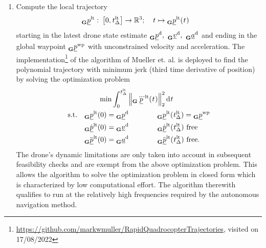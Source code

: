 \begin{enumerate}
    \item Compute the local trajectory 
    \begin{align} \label{eq:loc_traj}
        \pos[]{\loctraj}{}{\grs}{}
        :\ 
        &\left[0, \dur[]{\loctraj}{}{}{}\right] \rightarrow \mathbb{R}^3
        ;\quad
        \timepnt[]{}{}{}{}
        \mapsto
        \pos[]{\loctraj}{}{\grs}{}(\timepnt[]{}{}{}{})
    \end{align}
    starting in the latest drone state estimate
    $\pos[]{\drone}{}{\grs}{}
    ,\ 
    \vel[]{\drone}{}{\grs}{}
    ,\ 
    \acc[]{\drone}{}{\grs}{}$
    and ending in the global waypoint
    $\pos[]{\wayp}{}{\grs}{}$
    with unconstrained velocity and acceleration.
    The implementation\footnote{
            \url{https://github.com/markwmuller/RapidQuadrocopterTrajectories}, visited on 17/08/2022
    } 
    of the algorithm of Mueller et. al. \cite{Mueller2013}
    is deployed to find the polynomial trajectory with minimum jerk
    (third time derivative of position)
    by solving the optimization problem
    \begin{align}
        &\qquad \min 
        \int_0^{\dur[]{\loctraj}{}{}{}}
            \left\|
                \pos[\dddot]{\loctraj}{}{\grs}{}(\timepnt[]{}{}{}{})
            \right\|^2_2
        \text d \timepnt[]{}{}{}{}
        \nonumber \\
        \text{s.t.}\quad
        & \pos[]{\loctraj}{}{\grs}{}(0) = \pos[]{\drone}{}{\grs}{}
        \qquad\qquad \pos[]{\loctraj}{}{\grs}{}(\dur[]{\loctraj}{}{}{}) = \pos[]{\wayp}{}{\grs}{}
        \nonumber \\
        & \pos[\dot]{\loctraj}{}{\grs}{}(0) = \vel[]{\drone}{}{\grs}{}
        \qquad\qquad \pos[\dot]{\loctraj}{}{\grs}{}(\dur[]{\loctraj}{}{}{}) \text{ free}
        \nonumber \\
        & \pos[\ddot]{\loctraj}{}{\grs}{}(0) = \acc[]{\drone}{}{\grs}{}
        \qquad\qquad \pos[\ddot]{\loctraj}{}{\grs}{}(\dur[]{\loctraj}{}{}{}) \text{ free}.
    \end{align}
    The drone's dynamic limitations
    are only taken into account in subsequent feasibility checks 
    and are exempt from the above optimization problem.
    This allows the algorithm to solve the optimization problem in closed form
    which is characterized by low computational effort.
    The algorithm therewith qualifies 
    to run at the relatively high frequencies
    required by the autonomous navigation method.
\end{enumerate}


